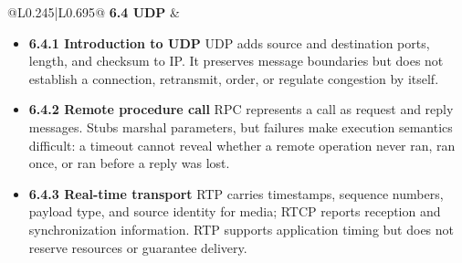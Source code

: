 \documentclass[10pt,letterpaper]{article}
\begin{document}
\begin{longtable}{@{}L{0.245\textwidth}|L{0.695\textwidth}@{}}
\textbf{6.4 UDP} & \begin{minipage}[t]{\linewidth}\raggedright \begin{itemize}\item \textbf{6.4.1 Introduction to UDP} UDP adds source and destination ports, length, and checksum to IP. It preserves message boundaries but does not establish a connection, retransmit, order, or regulate congestion by itself.\item \textbf{6.4.2 Remote procedure call} RPC represents a call as request and reply messages. Stubs marshal parameters, but failures make execution semantics difficult: a timeout cannot reveal whether a remote operation never ran, ran once, or ran before a reply was lost.\item \textbf{6.4.3 Real-time transport} RTP carries timestamps, sequence numbers, payload type, and source identity for media; RTCP reports reception and synchronization information. RTP supports application timing but does not reserve resources or guarantee delivery.\end{itemize}\end{minipage} \\ \hline

\end{longtable}
\end{document}
